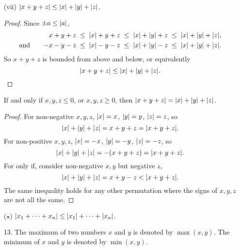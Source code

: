 \documentclass[11pt]{article}
\begin{document}
\begin{enumerate}
    \item[(vii)] $\lvert x + y + z\rvert \leq \lvert x\rvert + \lvert y\rvert + \lvert z\rvert$.
          \begin{proof}
              Since $\pm a \leq \lvert a\rvert$,
              \[
                  \begin{aligned}
                       &
                       &
                      x + y + z
                       &
                      \; \leq \; \lvert x\rvert + y + z
                      \; \leq \; \lvert x\rvert + \lvert y\rvert + z
                      \; \leq \; \lvert x\rvert + \lvert y\rvert + \lvert z\rvert, \\
                      \text{and} \quad
                       &
                       &
                      -x - y - z
                       &
                      \; \leq \; \lvert x\rvert - y - z
                      \; \leq \; \lvert x\rvert + \lvert y\rvert - z
                      \; \leq \; \lvert x\rvert + \lvert y\rvert + \lvert z\rvert.
                  \end{aligned}
              \]
              So $x + y + z$ is bounded from above and below, or equivalently
              \[
                  \lvert x + y + z\rvert \leq \lvert x\rvert + \lvert y\rvert + \lvert z\rvert.
              \]
          \end{proof}

          If and only if $x, y, z \leq 0$, or $x, y, z \geq 0$, then $\lvert x + y + z\rvert = \lvert x\rvert +
              \lvert y\rvert + \lvert z\rvert$.
          \begin{proof}
              For non-negative $x, y, z$, $\lvert x\rvert = x$, $\lvert y\rvert = y$, $\lvert z\rvert = z$, so
              \[
                  \lvert x\rvert + \lvert y\rvert + \lvert z\rvert = x + y + z = \lvert x + y + z\rvert.
              \]
              For non-positive $x, y, z$, $\lvert x\rvert = -x$, $\lvert y\rvert = -y$, $\lvert z\rvert = -z$, so
              \[
                  \lvert x\rvert + \lvert y\rvert + \lvert z\rvert = -(x + y + z) = \lvert x + y + z\rvert.
              \]
              For only if, consider non-negative $x, y$ but negative $z$,
              \[
                  \lvert x\rvert + \lvert y\rvert + \lvert z\rvert = x + y - z < \lvert x + y + z\rvert.
              \]
              The same inequality holds for any other permutation where the signs of $x, y, z$ are
              not all the same.
          \end{proof}

    \item[($\star$)] $\lvert x_1 + \dots + x_n\rvert \leq \lvert x_1\rvert + \dots + \lvert x_n\rvert$.

          \pagebreak

    \item[13.] The maximum of two numbers $x$ and $y$ is denoted by $\max(x, y)$.  The minimum of
          $x$ and $y$ is denoted by $\min(x, y)$.


\end{enumerate}
\end{document}
